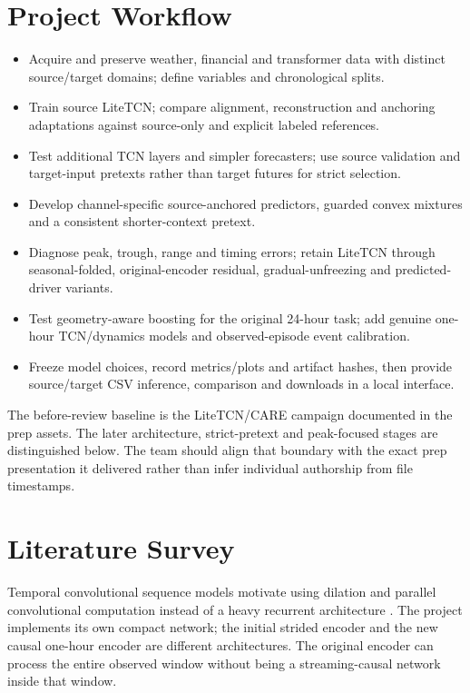 \documentclass[twoside,english]{article}
\begin{document}
\section{Project Workflow}
\begin{itemize}
\item Acquire and preserve weather, financial and transformer data with distinct source/target domains; define variables and chronological splits.
\item Train source LiteTCN; compare alignment, reconstruction and anchoring adaptations against source-only and explicit labeled references.
\item Test additional TCN layers and simpler forecasters; use source validation and target-input pretexts rather than target futures for strict selection.
\item Develop channel-specific source-anchored predictors, guarded convex mixtures and a consistent shorter-context pretext.
\item Diagnose peak, trough, range and timing errors; retain LiteTCN through seasonal-folded, original-encoder residual, gradual-unfreezing and predicted-driver variants.
\item Test geometry-aware boosting for the original 24-hour task; add genuine one-hour TCN/dynamics models and observed-episode event calibration.
\item Freeze model choices, record metrics/plots and artifact hashes, then provide source/target CSV inference, comparison and downloads in a local interface.
\end{itemize}
The before-review baseline is the LiteTCN/CARE campaign documented in the prep assets. The later architecture, strict-pretext and peak-focused stages are distinguished below. The team should align that boundary with the exact prep presentation it delivered rather than infer individual authorship from file timestamps.

\section{Literature Survey}\label{sec:litsurvey}
Temporal convolutional sequence models motivate using dilation and parallel convolutional computation instead of a heavy recurrent architecture \citep{Bai18}. The project implements its own compact network; the initial strided encoder and the new causal one-hour encoder are different architectures. The original encoder can process the entire observed window without being a streaming-causal network inside that window.
\end{document}
